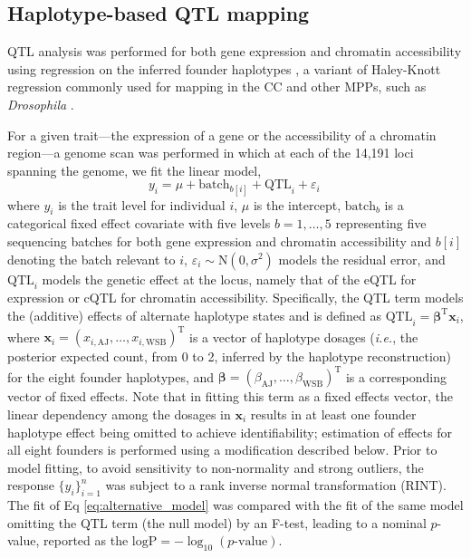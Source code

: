 \documentclass[10pt,letterpaper]{article}
\newcommand{\ie}{\emph{i.e.}\xspace}
\newcommand{\T}{^\mathrm{T}}
\newcommand{\bbeta}{\boldsymbol{\beta}}
\newcommand{\bx}{\mathbf{x}}
\begin{document}
\subsection*{Haplotype-based QTL mapping}

QTL analysis was performed for both gene expression and chromatin accessibility using regression on the inferred founder haplotypes \cite{Mott2000}, a variant of Haley-Knott regression \cite{Haley1992,Martinez1992} commonly used for mapping in the CC \cite{Valdar2006c,Aylor2011,Gralinski2015,Kelada2016,Donoghue2017,Keele2019} and other MPPs, such as \textit{Drosophila} \cite{King2012}.

For a given trait---the expression of a gene or the accessibility of a chromatin region---a genome scan was performed in which at each of the 14,191 loci spanning the genome, we fit the linear model,
\begin{equation}
  y_i = \mu + \text{batch}_{b[i]} + \text{QTL}_i + \varepsilon_i\, 
  \label{eq:alternative_model}
\end{equation}
where $y_{i}$ is the trait level for individual $i$, $\mu$ is the intercept, $\text{batch}_b$ is a categorical fixed effect covariate with five levels $b=1,\dots,5$ representing five sequencing batches for both gene expression and chromatin accessibility and $b[i]$ denoting the batch relevant to $i$, $\varepsilon_i\sim\text{N}(0,\sigma^2)$ models the residual error, and $\text{QTL}_{i}$ models the genetic effect at the locus, namely that of the eQTL for expression or cQTL for chromatin accessibility. Specifically, the QTL term models the (additive) effects of alternate haplotype states and is defined as $\text{QTL}_{i}=\bbeta\T\bx_i$, where $\bx_i=(x_{i,\text{AJ}},\dots,x_{i,\text{WSB}})\T$ is a vector of haplotype dosages (\ie, the posterior expected count, from 0 to 2, inferred by the haplotype reconstruction) for the eight founder haplotypes, and $\bbeta=(\beta_\text{AJ},\dots,\beta_\text{WSB})\T$ is a corresponding vector of fixed effects. Note that in fitting this term as a fixed effects vector, the linear dependency among the dosages in $\bx_i$ results in at least one founder haplotype effect being omitted to achieve identifiability; estimation of effects for all eight founders is performed using a modification described below. Prior to model fitting, to avoid sensitivity to non-normality and strong outliers, the response $\{y_i\}^n_{i=1}$ was subject to a rank inverse normal transformation (RINT).
The fit of Eq \ref{eq:alternative_model} was compared with the fit of the same model omitting the QTL term (the null model) by an F-test, leading to a nominal $p$-value, reported as the $\text{logP}=-\log_{10}(\text{$p$-value})$. %
\end{document}

